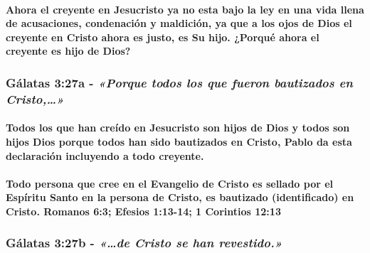 \documentclass[11a pt,twoside]{article}
\newcommand{\scripture}[1]{%
  {\fontsize{12pt}{16pt}\selectfont\ScriptureFont\itshape #1}%
}
\let\oldsubsubsection\subsubsection
\renewcommand{\subsubsection}{\needspace{4\baselineskip}\oldsubsubsection}
\let\oldparagraph\paragraph
\renewcommand{\paragraph}{\needspace{3\baselineskip}\oldparagraph}
\begin{document}
\paragraph{Ahora el creyente en Jesucristo ya no esta bajo la ley en una
vida llena de acusaciones, condenación y maldición, ya que a los ojos de
Dios el creyente en Cristo ahora es justo, es Su hijo. ¿Porqué ahora el
creyente es hijo de
Dios?}\label{ahora-el-creyente-en-jesucristo-ya-no-esta-bajo-la-ley-en-una-vida-llena-de-acusaciones-condenaciuxf3n-y-maldiciuxf3n-ya-que-a-los-ojos-de-dios-el-creyente-en-cristo-ahora-es-justo-es-su-hijo.-porquuxe9-ahora-el-creyente-es-hijo-de-dios}

\subsubsection{\texorpdfstring{Gálatas 3:27a -
\scripture{«Porque todos los que fueron bautizados en Cristo,…»}}{Gálatas 3:27a - }}\label{guxe1latas-327a---porque-todos-los-que-fueron-bautizados-en-cristo}

\paragraph{Todos los que han creído en Jesucristo son hijos de Dios y
todos son hijos Dios porque todos han sido bautizados en Cristo, Pablo
da esta declaración incluyendo a todo
creyente.}\label{todos-los-que-han-creuxeddo-en-jesucristo-son-hijos-de-dios-y-todos-son-hijos-dios-porque-todos-han-sido-bautizados-en-cristo-pablo-da-esta-declaraciuxf3n-incluyendo-a-todo-creyente.}

\paragraph{Todo persona que cree en el Evangelio de Cristo es sellado
por el Espíritu Santo en la persona de Cristo, es bautizado
(identificado) en Cristo. Romanos 6:3; Efesios 1:13-14; 1 Corintios
12:13}\label{todo-persona-que-cree-en-el-evangelio-de-cristo-es-sellado-por-el-espuxedritu-santo-en-la-persona-de-cristo-es-bautizado-identificado-en-cristo.-romanos-63-efesios-113-14-1-corintios-1213}

\subsubsection{\texorpdfstring{Gálatas 3:27b -
\scripture{«…de Cristo se han revestido.»}}{Gálatas 3:27b - }}\label{guxe1latas-327b---de-cristo-se-han-revestido.}
\end{document}
